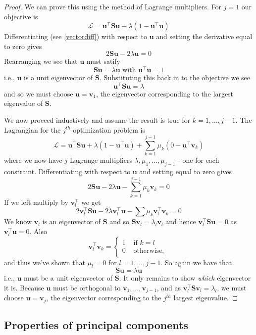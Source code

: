 \documentclass[
]{book}
\theoremstyle{definition}
\theoremstyle{definition}
\theoremstyle{definition}
\theoremstyle{definition}
\theoremstyle{remark}
\begin{document}
\begin{proof}
We can prove this using the method of Lagrange multipliers. For \(j=1\) our objective is
\[\mathcal{L} = \mathbf u^\top  \mathbf S\mathbf u+\lambda(1-\mathbf u^\top \mathbf u)\]
Differentiating (see \ref{vectordiff}) with respect to \(\mathbf u\) and setting the derivative equal to zero gives
\[2\mathbf S\mathbf u-2\lambda \mathbf u=0\]
Rearranging we see that \(\mathbf u\) must satify
\[\mathbf S\mathbf u=\lambda \mathbf u\mbox{ with } \mathbf u^\top \mathbf u=1\]
i.e., \(\mathbf u\) is a unit eigenvector of \(\mathbf S\). Substituting this back in to the objective we see
\[\mathbf u^\top \mathbf S\mathbf u= \lambda\]
and so we must choose \(\mathbf u=\mathbf v_1\), the eigenvector corresponding to the largest eigenvalue of \(\mathbf S\).

We now proceed inductively and assume the result is true for \(k=1, \ldots, j-1\). The Lagrangian for the \(j^{th}\) optimization problem is
\[\mathcal{L} = \mathbf u^\top  \mathbf S\mathbf u+\lambda(1-\mathbf u^\top \mathbf u) +\sum_{k=1}^{j-1}\mu_k (0-\mathbf u^\top \mathbf v_k)\]
where we now have \(j\) Lagrange multipliers \(\lambda, \mu_1, \ldots, \mu_{j-1}\) - one for each constraint.
Differentiating with respect to \(\mathbf u\) and setting equal to zero gives
\[2\mathbf S\mathbf u- 2\lambda \mathbf u- \sum_{k=1}^{j-1} \mu_k\mathbf v_k=0 \]
If we left multiply by \(\mathbf v_l^\top\) we get
\[2\mathbf v_l^\top \mathbf S\mathbf u- 2\lambda \mathbf v_l^\top \mathbf u- \sum \mu_k \mathbf v_l^\top \mathbf v_k =0\]
We know \(\mathbf v_l\) is an eigenvector of \(\mathbf S\) and so \(\mathbf S\mathbf v_l=\lambda_l \mathbf v_l\) and hence \(\mathbf v_l^\top \mathbf S\mathbf u=0\) as \(\mathbf v_l^\top \mathbf u=0\). Also \[\mathbf v_l^\top\mathbf v_k=\begin{cases}1 &\mbox{ if } k=l\\
0 &\mbox{ otherwise, }\end{cases}\] and thus we've shown that \(\mu_l=0\) for \(l=1, \ldots, j-1\). So again we have that \[\mathbf S\mathbf u= \lambda \mathbf u\]
i.e., \(\mathbf u\) must be a unit eigenvector of \(\mathbf S\). It only remains to show \emph{which} eigenvector it is. Because \(\mathbf u\) must be orthogonal to \(\mathbf v_1, \ldots, \mathbf v_{j-1}\),
and as \(\mathbf v_l^\top \mathbf S\mathbf v_l = \lambda_l\), we must choose \(\mathbf u=\mathbf v_j\), the eigenvector corresponding to the \(j^{th}\) largest eigenvalue.
\end{proof}

\hypertarget{properties-of-principal-components}{%
\subsection{Properties of principal components}\label{properties-of-principal-components}}
\end{document}
